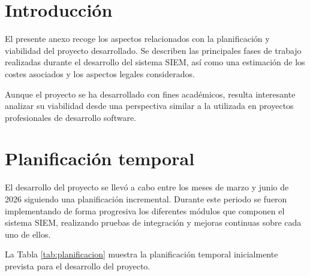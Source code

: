 
\section{Introducción}

El presente anexo recoge los aspectos relacionados con la planificación y viabilidad del proyecto desarrollado. Se describen las principales fases de trabajo realizadas durante el desarrollo del sistema SIEM, así como una estimación de los costes asociados y los aspectos legales considerados.

Aunque el proyecto se ha desarrollado con fines académicos, resulta interesante analizar su viabilidad desde una perspectiva similar a la utilizada en proyectos profesionales de desarrollo software.

\section{Planificación temporal}

El desarrollo del proyecto se llevó a cabo entre los meses de marzo y junio de 2026 siguiendo una planificación incremental. Durante este periodo se fueron implementando de forma progresiva los diferentes módulos que componen el sistema SIEM, realizando pruebas de integración y mejoras continuas sobre cada uno de ellos.

La Tabla \ref{tab:planificacion} muestra la planificación temporal inicialmente prevista para el desarrollo del proyecto.

